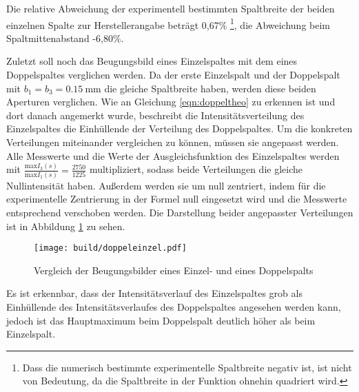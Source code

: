 \newpage
Die relative Abweichung der experimentell bestimmten Spaltbreite der beiden einzelnen
Spalte zur Herstellerangabe beträgt 0,67\% \footnote{Dass die numerisch bestimmte
experimentelle Spaltbreite negativ ist, ist nicht von Bedeutung, da die Spaltbreite
in der Funktion ohnehin quadriert wird.}, die Abweichung beim Spaltmittenabstand
-6,80\%.

Zuletzt soll noch das Beugungsbild eines Einzelspaltes mit dem eines Doppelspaltes
verglichen werden. Da der erste Einzelspalt und der Doppelspalt mit $b_1 = b_3 = \SI{0.15}{\milli\meter}$
die gleiche Spaltbreite haben, werden diese beiden Aperturen verglichen.
Wie an Gleichung \eqref{eqn:doppeltheo} zu erkennen ist und dort danach angemerkt
wurde, beschreibt die Intensitätsverteilung des Einzelspaltes die Einhüllende
der Verteilung des Doppelspaltes. Um die konkreten Verteilungen miteinander vergleichen
zu können, müssen sie angepasst werden. Alle Messwerte und die Werte der Ausgleichsfunktion
des Einzelspaltes werden mit $\frac{\text{max} I_3(s)}{\text{max} I_1(s)} = \frac{2750}{1225}$
multipliziert, sodass beide Verteilungen die gleiche Nullintensität haben. Außerdem
werden sie um null zentriert, indem für die experimentelle Zentrierung in der Formel
null eingesetzt wird und die Messwerte entsprechend verschoben werden.
Die Darstellung beider angepasster Verteilungen ist in Abbildung \ref{fig:doppeleinzel}
zu sehen.

\begin{figure}
  \centering
  \texttt{[image: build/doppeleinzel.pdf]}
  \caption{Vergleich der Beugungsbilder eines Einzel- und eines Doppelspalts}
  \label{fig:doppeleinzel}
\end{figure}

Es ist erkennbar, dass der Intensitätsverlauf des Einzelspaltes grob als Einhüllende
des Intensitätsverlaufes des Doppelspaltes angesehen werden kann, jedoch ist das Hauptmaximum
beim Doppelspalt deutlich höher als beim Einzelspalt.
